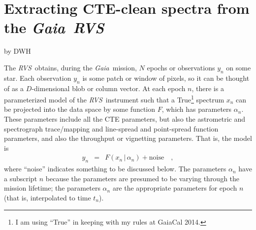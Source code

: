 \documentclass[11pt]{article}
\newcommand{\given}{\,|\,}
\newcommand{\instrument}[1]{\textsl{#1}}
\newcommand{\Gaia}{\instrument{Gaia}}
\newcommand{\RVS}{\instrument{RVS}}
\begin{document}
\section*{Extracting CTE-clean spectra from the \Gaia\ \RVS}
\noindent
by DWH

\begin{abstract}

The \Gaia~\RVS\ data will suffer from observable distortions (CTE)
caused by radiation damage and the charge traps that are caused
thereby.
The \RVS\ team is creating empirical models of the time-dependent
distortions.
These models are computationally feasible to ``run forward''; indeed
parameter estimation (radial velocities, temperatures, and so on)
based on the \RVS\ will be based on a forward model of the data,
including the CTE.
Here we show that it is possible to extract CTE-undistorted spectra
from either single epochs or else multiple epochs of \RVS\ data using
one of these CTE models.
There is no need to ``undistort'' or ``correct'' the data.
Inasmuch as these extracted spectra and their uncertainty tensors will
be close to sufficient statistics for the raw data, they could be used
for stellar parameter estimation.
\end{abstract}

The \RVS\ obtains, during the \Gaia\ mission, $N$ epochs or
observations $y_n$ on some star.
Each observation $y_n$ is some patch or window of pixels, so it can be
thought of as a $D$-dimensional blob or column vector.
At each epoch $n$, there is a parameterized model of the
\RVS\ instrument such that a True\footnote{I am using ``True'' in
  keeping with my rules at GaiaCal 2014.} spectrum $x_n$ can be
projected into the data space by some function $F$, which has
parameters $\alpha_n$.
These parameters include all the CTE parameters, but also the
astrometric and spectrograph trace/mapping and line-spread and
point-spread function parameters, and also the throughput or vignetting parameters.
That is, the model is
\begin{eqnarray}
y_n &=& F(x_n\given \alpha_n) + \mbox{noise}
\quad,
\end{eqnarray}
where ``noise'' indicates something to be discussed below.
The parameters $\alpha_n$ have a subscript $n$ because the parameters
are presumed to be varying through the mission lifetime; the
parameters $\alpha_n$ are the appropriate parameters for epoch $n$
(that is, interpolated to time $t_n$).
\end{document}
